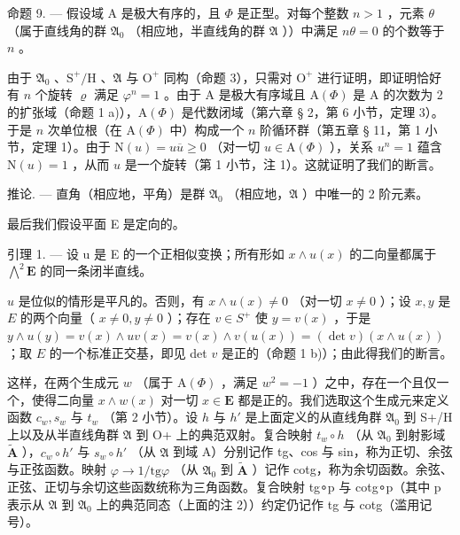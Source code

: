 命题 9. --- 假设域 A 是极大有序的，且 \(\Phi\) 是正型。对每个整数 \(n>1\) ，元素 \(\theta\) （属于直线角的群 \(\mathfrak{A}_{0}\) （相应地，半直线角的群 \(\mathfrak{A}\) ））中满足 \(n\theta=0\) 的个数等于 \(n\) 。

由于 \(\mathfrak{A}_{0}\) 、\(\mathrm{S}^{+}/\mathrm{H}\) 、\(\mathfrak{A}\) 与 \(\mathrm{O}^{+}\) 同构（命题 3），只需对 \(\mathrm{O}^{+}\) 进行证明，即证明恰好有 \(n\) 个旋转 \(\varrho\) 满足 \(\varphi^{n}=1\) 。由于 A 是极大有序域且 \(\mathrm{A}(\Phi)\) 是 A 的次数为 2 的扩张域（命题 1 a)），\(\mathrm{A}(\Phi)\) 是代数闭域（第六章 § 2，第 6 小节，定理 3）。于是 \(n\) 次单位根（在 \(\mathrm{A}(\Phi)\) 中）构成一个 \(n\) 阶循环群（第五章 § 11，第 1 小节，定理 1）。由于 \(\mathrm{N}(u)=u\overline{u}\geqslant0\) （对一切 \(u\in\mathrm{A}(\Phi)\) ），关系 \(u^{n}=1\) 蕴含 \(\mathrm{N}(u)=1\) ，从而 \(u\) 是一个旋转（第 1 小节，注 1）。这就证明了我们的断言。

推论. --- 直角（相应地，平角）是群 \(\mathfrak{A}_{0}\) （相应地，\(\mathfrak{A}\) ）中唯一的 2 阶元素。

最后我们假设平面 E 是定向的。

引理 1. --- 设 u 是 E 的一个正相似变换；所有形如 \(x \wedge u(x)\) 的二向量都属于 \(\bigwedge^{2}\mathbf{E}\) 的同一条闭半直线。

\(u\) 是位似的情形是平凡的。否则，有 \(x \wedge u(x) \neq 0\) （对一切 \(x \neq 0\) ）；设 \(x, y\) 是 \(E\) 的两个向量（ \(x \neq 0, y \neq 0\) ）；存在 \(v \in S^+\) 使 \(y = v(x)\) ，于是 \(y \wedge u(y) = v(x) \wedge uv(x) = v(x) \wedge v(u(x)) = (\det v)(x \wedge u(x))\) ；取 \(E\) 的一个标准正交基，即见 det \(v\) 是正的（命题 1 b)）；由此得我们的断言。

这样，在两个生成元 \(w\) （属于 \(\mathrm{A}(\Phi)\) ，满足 \(w^{2} = -1\) ）之中，存在一个且仅一个，使得二向量 \(x \wedge w(x)\) 对一切 \(x\in\mathbf{E}\) 都是正的。我们选取这个生成元来定义函数 \(c_{w}, s_{w}\) 与 \(t_{w}\) （第 2 小节）。设 \(h\) 与 \(h'\) 是上面定义的从直线角群 \(\mathfrak{A}_{0}\) 到 S+/H 上以及从半直线角群 \(\mathfrak{A}\) 到 O+ 上的典范双射。复合映射 \(t_{w}\circ h\) （从 \(\mathfrak{A}_{0}\) 到射影域 \(\tilde{\mathbf{A}}\) ），\(c_{w}\circ h'\) 与 \(s_{w}\circ h'\) （从 \(\mathfrak{A}\) 到域 A）分别记作 tg、cos 与 sin，称为正切、余弦与正弦函数。映射 \(\varphi\to1/\mathrm{tg}\varphi\) （从 \(\mathfrak{A}_{0}\) 到 \(\tilde{\mathbf{A}}\) ）记作 cotg，称为余切函数。余弦、正弦、正切与余切这些函数统称为三角函数。复合映射 tg∘p 与 cotg∘p（其中 p 表示从 \(\mathfrak{A}\) 到 \(\mathfrak{A}_{0}\) 上的典范同态（上面的注 2））约定仍记作 tg 与 cotg（滥用记号）。

